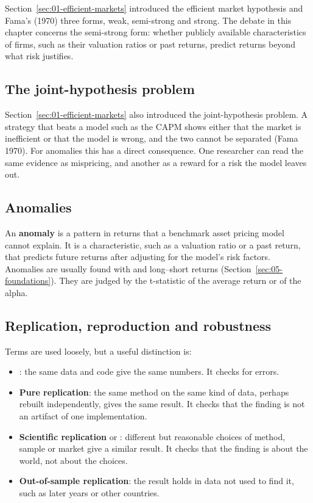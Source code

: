 Section~\ref{sec:01-efficient-markets} introduced the efficient market hypothesis and Fama's (1970) three forms, weak, semi-strong and strong. The debate in this chapter concerns the semi-strong form: whether publicly available characteristics of firms, such as their valuation ratios or past returns, predict returns beyond what risk justifies.

\subsection{The joint-hypothesis problem}

Section~\ref{sec:01-efficient-markets} also introduced the joint-hypothesis problem. A strategy that beats a model such as the CAPM shows either that the market is inefficient or that the model is wrong, and the two cannot be separated (Fama 1970). For anomalies this has a direct consequence. One researcher can read the same evidence as mispricing, and another as a reward for a risk the model leaves out.

\subsection{Anomalies}

An \textbf{anomaly} is a pattern in returns that a benchmark asset pricing model cannot explain. It is a characteristic, such as a valuation ratio or a past return, that predicts future returns after adjusting for the model's risk factors. Anomalies are usually found with  and long--short returns (Section~\ref{sec:05-foundations}). They are judged by the t-statistic of the average return or of the alpha.

\subsection{Replication, reproduction and robustness}

Terms are used loosely, but a useful distinction is:

\begin{itemize}
  \item {}: the same data and code give the same numbers. It checks for errors.
  \item \textbf{Pure replication}: the same method on the same kind of data, perhaps rebuilt independently, gives the same result. It checks that the finding is not an artifact of one implementation.
  \item \textbf{Scientific replication} or : different but reasonable choices of method, sample or market give a similar result. It checks that the finding is about the world, not about the choices.
  \item \textbf{Out-of-sample replication}: the result holds in data not used to find it, such as later years or other countries.
\end{itemize}

